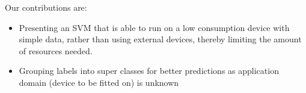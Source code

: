 Our contributions are:
\begin{itemize}
    \item Presenting an SVM that is able to run on a low consumption device with simple data, rather than using external devices, thereby limiting the amount of resources needed.
    \item Grouping labels into super classes for better predictions as application domain (device to be fitted on) is unknown 
\end{itemize}
